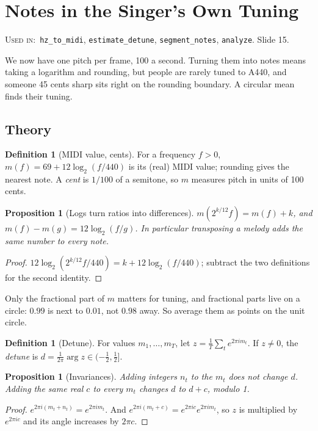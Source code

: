 \documentclass[11pt]{article}
\newtheorem{proposition}[theorem]{Proposition}
\theoremstyle{definition}
\newtheorem{definition}[theorem]{Definition}
\newcommand{\code}[1]{\texttt{#1}}
\newcommand{\usedin}[1]{\par\noindent\colorbox{black!8}{\parbox{\dimexpr\linewidth-2\fboxsep\relax}{\small\textsc{Used in:}~#1}}\par\medskip}
\begin{document}
\section{Notes in the Singer's Own Tuning}\label{sec:notes}
\usedin{\code{hz\_to\_midi}, \code{estimate\_detune}, \code{segment\_notes},
\code{analyze}. Slide 15.}

We now have one pitch per frame, 100 a second. Turning them into notes means taking a
logarithm and rounding, but people are rarely tuned to A440, and someone 45 cents
sharp sits right on the rounding boundary. A circular mean finds their tuning.

\subsection{Theory}

\begin{definition}[MIDI value, cents]
For a frequency $f>0$, $m(f)=69+12\log_2(f/440)$ is its (real) MIDI value; rounding
gives the nearest note. A \emph{cent} is $1/100$ of a semitone, so $m$ measures pitch
in units of 100 cents.
\end{definition}

\begin{proposition}[Logs turn ratios into differences]
$m(2^{k/12}f)=m(f)+k$, and $m(f)-m(g)=12\log_2(f/g)$. In particular transposing a
melody adds the same number to every note.
\end{proposition}
\begin{proof}
$12\log_2(2^{k/12}f/440)=k+12\log_2(f/440)$; subtract the two definitions for the
second identity.
\end{proof}

Only the fractional part of $m$ matters for tuning, and fractional parts live on a
circle: $0.99$ is next to $0.01$, not $0.98$ away. So average them as points on the
unit circle.

\begin{definition}[Detune]
For values $m_1,\dots,m_T$, let $z=\frac1T\sum_te^{2\pi im_t}$. If $z\ne0$, the
\emph{detune} is $d=\frac1{2\pi}\arg z\in(-\frac12,\frac12]$.
\end{definition}

\begin{proposition}[Invariances]\label{prop:detuneinv}
Adding integers $n_t$ to the $m_t$ does not change $d$. Adding the same real $c$ to
every $m_t$ changes $d$ to $d+c$, modulo 1.
\end{proposition}
\begin{proof}
$e^{2\pi i(m_t+n_t)}=e^{2\pi im_t}$. And $e^{2\pi i(m_t+c)}=e^{2\pi ic}e^{2\pi im_t}$,
so $z$ is multiplied by $e^{2\pi ic}$ and its angle increases by $2\pi c$.
\end{proof}
\end{document}
